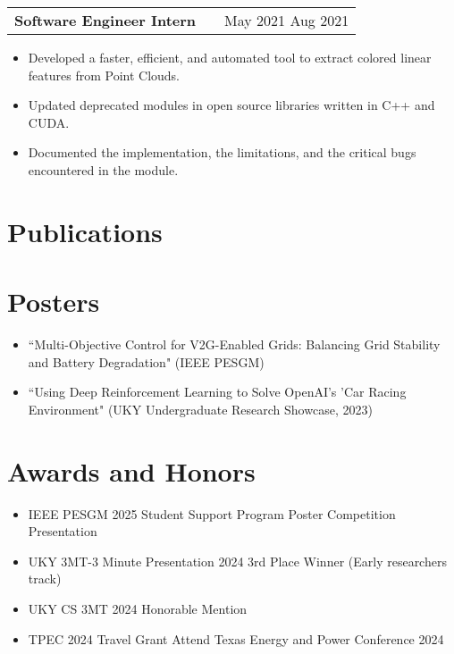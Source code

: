 \documentclass[a4paper,12pt]{article}
\makeatletter
\newenvironment{joblong}[2]
    {
    \begin{tabularx}{\linewidth}{@{}l X r@{}}
    \textbf{#1} & \hfill &  #2 \\[3.75pt]
    \end{tabularx}
    \begin{minipage}[t]{\linewidth}
    \begin{itemize}[nosep,after=\strut, leftmargin=1em, itemsep=3pt,label=--]
    }
    {
    \end{itemize}
    \end{minipage}    
    }
\makeatother
\begin{document}
\begin{joblong}{Software Engineer Intern}{May 2021 Aug 2021} %
\item Developed a faster, efficient, and automated tool to extract colored linear features from Point Clouds. %
\item Updated deprecated modules in open source libraries written in C++ and CUDA. %
\item Documented the implementation, the limitations, and the critical bugs encountered in the module. %
\end{joblong}

\section{Publications}
\begin{refsection}
\nocite{*} %
\printbibliography[heading=none]
\end{refsection}

\section{Posters}
\begin{itemize}[nosep,after=\strut, leftmargin=1em, itemsep=3pt,label=--]
\item ``Multi-Objective Control for V2G-Enabled Grids: Balancing Grid Stability and Battery Degradation" (IEEE PESGM) %
\item ``Using Deep Reinforcement Learning to Solve OpenAI's 'Car Racing Environment" (UKY Undergraduate Research Showcase, 2023) %
\end{itemize}

\section{Awards and Honors}
\begin{itemize}[nosep,after=\strut, leftmargin=1em, itemsep=3pt,label=--]
\item IEEE PESGM 2025 Student Support Program Poster Competition Presentation %
\item UKY 3MT-3 Minute Presentation 2024 3rd Place Winner (Early researchers track) %
\item UKY CS 3MT 2024 Honorable Mention %
\item TPEC 2024 Travel Grant Attend Texas Energy and Power Conference 2024 %
\end{itemize}
\end{document}
